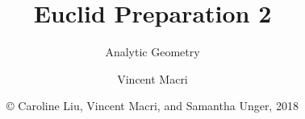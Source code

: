 

\title{Euclid Preparation 2}
\subtitle{Analytic Geometry}
\author{Vincent Macri}
\date{\copyright{} Caroline Liu, Vincent Macri, and Samantha Unger, 2018}


	\frame{\titlepage}
	

